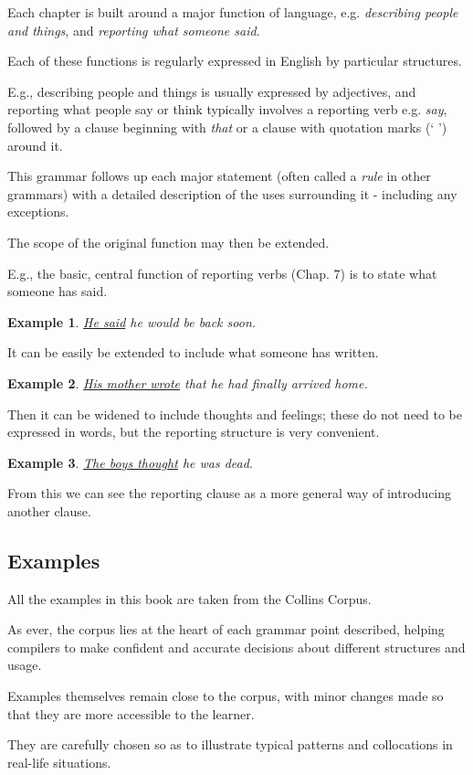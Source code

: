 \documentclass[oneside]{book}
\numberwithin{equation}{section}
\newtheorem{example}{Example}[section]
\begin{document}
%
Each chapter is built around a major function of language, e.g. \textit{describing people and things}, and \textit{reporting what someone said}.

Each of these functions is regularly expressed in English by particular structures.

E.g., describing people and things is usually expressed by adjectives, and reporting what people say or think typically involves a reporting verb e.g. \textit{say}, followed by a clause beginning with \textit{that} or a clause with quotation marks (` ') around it.

%
This grammar follows up each major statement (often called a \textit{rule} in other grammars) with a detailed description of the uses surrounding it - including any exceptions.

The scope of the original function may then be extended.

E.g., the basic, central function of reporting verbs (Chap. 7) is to state what someone has said.
\begin{example}
    \underline{He said} he would be back soon.
\end{example}
It can be easily be extended to include what someone has written.
\begin{example}
    \underline{His mother wrote} that he had finally arrived home.
\end{example}
Then it can be widened to include thoughts and feelings; these do not need to be expressed in words, but the reporting structure is very convenient.
\begin{example}
    \underline{The boys thought} he was dead.
\end{example}
From this we can see the reporting clause as a more general way of introducing another clause.

\subsection*{Examples}
All the examples in this book are taken from the Collins Corpus.

%
As ever, the corpus lies at the heart of each grammar point described, helping compilers to make confident and accurate decisions about different structures and usage.

Examples themselves remain close to the corpus, with minor changes made so that they are more accessible to the learner.

They are carefully chosen so as to illustrate typical patterns and collocations in real-life situations.
\end{document}
